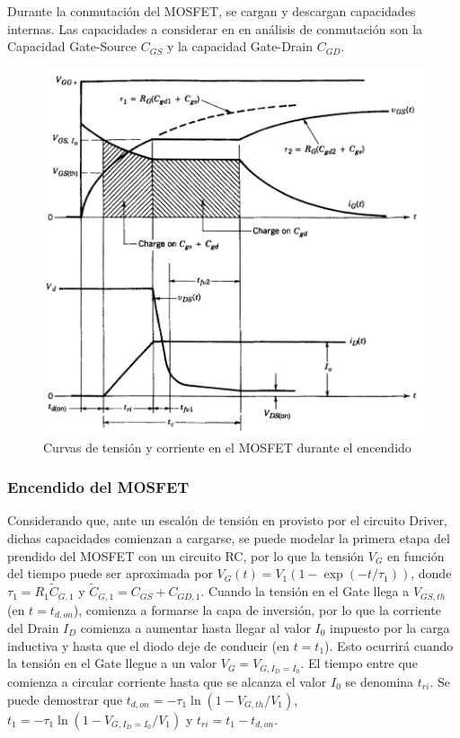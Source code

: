 \documentclass[e4_tp1_main.tex]{subfiles}
\begin{document}
Durante la conmutación del MOSFET, se cargan y descargan capacidades internas. Las capacidades a considerar en en análisis de conmutación son la Capacidad Gate-Source $C_{GS}$ y la capacidad Gate-Drain $C_{GD}$.

\begin{figure}
  \centering
  \includegraphics[width=\linewidth]{images/ej1/theory_mosfet.png}
  \caption{Curvas de tensión y corriente en el MOSFET durante el encendido}
  \label{fig:mosfet_theory}
\end{figure}
\subsubsection{Encendido del MOSFET}




Considerando que, ante un escalón de tensión en provisto por el circuito Driver, dichas capacidades comienzan a cargarse, se puede modelar la primera etapa del prendido del MOSFET con un circuito RC, por lo que la tensión $V_{G}$ en función del tiempo puede ser aproximada por $V_G(t) = V_1 (1-\exp(-t/\tau_1))$, donde $\tau_1 = R_1\tilde{C}_{G,1}$ y $\tilde{C}_{G,1} = C_{GS} + C_{GD,1}$. Cuando la tensión en el Gate llega a $V_{GS,th}$ (en $t=t_{d,on}$), comienza a formarse la capa de inversión, por lo que la corriente del Drain $I_D$ comienza a aumentar hasta llegar al valor $I_0$ impuesto por la carga inductiva y hasta que el diodo deje de conducir (en $t=t_1$). Esto ocurrirá cuando la tensión en el Gate llegue a un valor $V_G=V_{G,I_D=I_0}$. El tiempo entre que comienza a circular corriente hasta que se alcanza el valor $I_0$ se denomina $t_{ri}$. Se puede demostrar que $t_{d,on} = -\tau_1 \ln\left(1-V_{G,th}/V_1\right)$, $t_{1} = -\tau_1 \ln\left(1-V_{G,I_D=I_0}/V_1\right)$ y $t_{ri} = t_{1} - t_{d,on}$.
\end{document}
